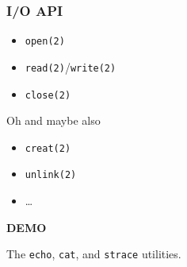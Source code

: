 \begin{frame}

\frametitle{I/O API}

\begin{itemize}

\item \texttt{open(2)}

\item \texttt{read(2)}/\texttt{write(2)}

\item \texttt{close(2)}

\end{itemize}

\pause

\vspace{\fill}

Oh and maybe also

\begin{itemize}

\item \texttt{creat(2)}

\item \texttt{unlink(2)}

\item \ldots

\end{itemize}

\end{frame}


\begin{frame}

\begin{center}

\Huge \textbf{DEMO}

\bigskip

\large The \texttt{echo}, \texttt{cat}, and \texttt{strace} utilities.

\end{center}


\end{frame}



